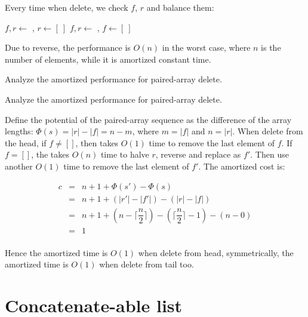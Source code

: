 \documentclass[b5paper]{article}
\begin{document}
Every time when delete, we check $f$, $r$ and balance them:

\begin{algorithmic}[1]
  \State {}
  \State $f, r \gets$ , 
   
    \State $r \gets [\ ]$
  \Else
    \State {}
  \EndIf
\EndFunction
\Statex
{}
  \State {}
  \State $f, r \gets$ , 
   
    \State $f \gets [\ ]$
  \Else
    \State {}
  \EndIf
\EndFunction
\end{algorithmic}

Due to reverse, the performance is $O(n)$ in the worst case, where $n$ is the number of elements, while it is amortized constant time.

\begin{Exercise}\label{ex:paired-array-seq}
Analyze the amortized performance for paired-array delete.
\end{Exercise}

\begin{Answer}[ref = {ex:paired-array-seq}]
Analyze the amortized performance for paired-array delete.

Define the potential of the paired-array sequence as the difference of the array lengths: $\Phi(s) = |r| - |f| = n - m$, where $m = |f|$ and $n = |r|$. When delete from the head, if $f \neq []$, then takes $O(1)$ time to remove the last element of $f$. If $f = []$, the takes $O(n)$ time to halve $r$, reverse and replace as $f'$. Then use another $O(1)$ time to remove the last element of $f'$. The amortized cost is:

\[
\begin{array}{rcl}
c & = & n + 1 + \Phi(s') - \Phi(s) \\
  & = & n + 1 + (|r'| - |f'|) - (|r| - |f|) \\
  & = & n + 1 + (n - \lceil \dfrac{n}{2} \rceil) - (\lceil \dfrac{n}{2} \rceil - 1) -  (n - 0) \\
  & = & 1 \\
\end{array}
\]

Hence the amortized time is $O(1)$ when delete from head, symmetrically, the amortized time is $O(1)$ when delete from tail too.
\end{Answer}

\section{Concatenate-able list}
\end{document}
